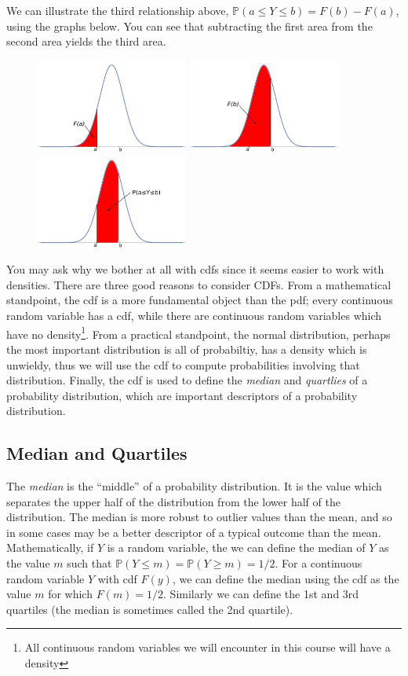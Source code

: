 \documentclass[12pt]{article}
\theoremstyle{definition}
\theoremstyle{remark}
\def\P{{\mathbb P}}
\begin{document}
We can illustrate the third relationship above, $\P(a \leq Y \leq b) = F(b) - F(a)$, using the graphs below. You can see that subtracting the first area from the second area yields the third area.
\begin{figure}[H]
\centering
\includegraphics[width=5cm]{normalcdfFa.pdf}
\includegraphics[width=5cm]{normalcdfFb.pdf}
\includegraphics[width=5cm]{normalcdfPab.pdf}
\end{figure}

You may ask why we bother at all with cdfs since it seems easier to work with densities. There are three good reasons to consider CDFs. From a mathematical standpoint, the cdf is a more fundamental object than the pdf; every continuous random variable has a cdf, while there are continuous random variables which have no density\footnote{All continuous random variables we will encounter in this course will have a density}. From a practical standpoint, the normal distribution, perhaps the most important distribution is all of probabiltiy, has a density which is unwieldy, thus we will use the cdf to compute probabilities involving that distribution. Finally, the cdf is used to define the \emph{median} and \emph{quartlies} of a probability distribution, which are important descriptors of a probability distribution.

\subsection{Median and Quartiles}
The \emph{median} is the ``middle'' of a probability distribution. It is the value which separates the upper half of the distribution from the lower half of the distribution. The median is more robust to outlier values than the mean, and so in some cases may be a better descriptor of a typical outcome than the mean. Mathematically, if $Y$ is a random variable, the we can define the median of $Y$ as the value $m$ such that $\P(Y \leq m) = \P(Y \geq m) = 1/2$. For a continuous random variable $Y$ with cdf $F(y)$, we can define the median using the cdf as the value $m$ for which $F(m) = 1/2$. Similarly we can define the 1st and 3rd quartiles (the median is sometimes called the 2nd quartile). 
\end{document}
